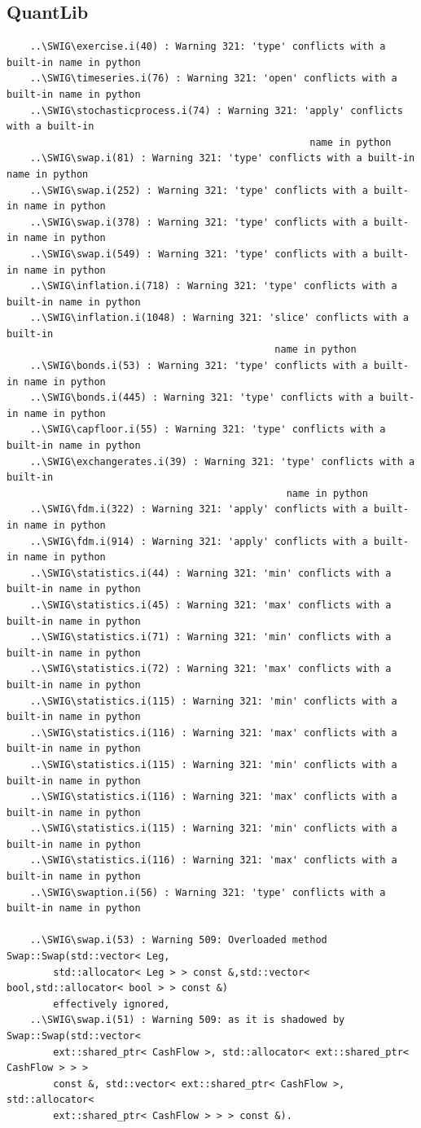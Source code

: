 \documentclass[10pt]{article}
\begin{document}
\subsection{QuantLib}
\begin{verbatim}
    ..\SWIG\exercise.i(40) : Warning 321: 'type' conflicts with a built-in name in python
    ..\SWIG\timeseries.i(76) : Warning 321: 'open' conflicts with a built-in name in python
    ..\SWIG\stochasticprocess.i(74) : Warning 321: 'apply' conflicts with a built-in
                                                    name in python
    ..\SWIG\swap.i(81) : Warning 321: 'type' conflicts with a built-in name in python
    ..\SWIG\swap.i(252) : Warning 321: 'type' conflicts with a built-in name in python
    ..\SWIG\swap.i(378) : Warning 321: 'type' conflicts with a built-in name in python
    ..\SWIG\swap.i(549) : Warning 321: 'type' conflicts with a built-in name in python
    ..\SWIG\inflation.i(718) : Warning 321: 'type' conflicts with a built-in name in python
    ..\SWIG\inflation.i(1048) : Warning 321: 'slice' conflicts with a built-in
                                              name in python
    ..\SWIG\bonds.i(53) : Warning 321: 'type' conflicts with a built-in name in python
    ..\SWIG\bonds.i(445) : Warning 321: 'type' conflicts with a built-in name in python
    ..\SWIG\capfloor.i(55) : Warning 321: 'type' conflicts with a built-in name in python
    ..\SWIG\exchangerates.i(39) : Warning 321: 'type' conflicts with a built-in
                                                name in python
    ..\SWIG\fdm.i(322) : Warning 321: 'apply' conflicts with a built-in name in python
    ..\SWIG\fdm.i(914) : Warning 321: 'apply' conflicts with a built-in name in python
    ..\SWIG\statistics.i(44) : Warning 321: 'min' conflicts with a built-in name in python
    ..\SWIG\statistics.i(45) : Warning 321: 'max' conflicts with a built-in name in python
    ..\SWIG\statistics.i(71) : Warning 321: 'min' conflicts with a built-in name in python
    ..\SWIG\statistics.i(72) : Warning 321: 'max' conflicts with a built-in name in python
    ..\SWIG\statistics.i(115) : Warning 321: 'min' conflicts with a built-in name in python
    ..\SWIG\statistics.i(116) : Warning 321: 'max' conflicts with a built-in name in python
    ..\SWIG\statistics.i(115) : Warning 321: 'min' conflicts with a built-in name in python
    ..\SWIG\statistics.i(116) : Warning 321: 'max' conflicts with a built-in name in python
    ..\SWIG\statistics.i(115) : Warning 321: 'min' conflicts with a built-in name in python
    ..\SWIG\statistics.i(116) : Warning 321: 'max' conflicts with a built-in name in python
    ..\SWIG\swaption.i(56) : Warning 321: 'type' conflicts with a built-in name in python

    ..\SWIG\swap.i(53) : Warning 509: Overloaded method Swap::Swap(std::vector< Leg,
        std::allocator< Leg > > const &,std::vector< bool,std::allocator< bool > > const &)
        effectively ignored,
    ..\SWIG\swap.i(51) : Warning 509: as it is shadowed by Swap::Swap(std::vector<
        ext::shared_ptr< CashFlow >, std::allocator< ext::shared_ptr< CashFlow > > >
        const &, std::vector< ext::shared_ptr< CashFlow >, std::allocator<
        ext::shared_ptr< CashFlow > > > const &).
\end{verbatim}
\end{document}
